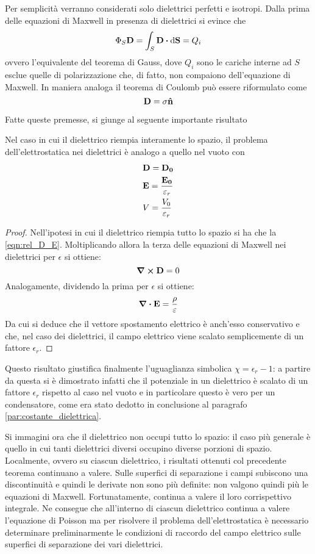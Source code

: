 Per semplicità verranno considerati solo dielettrici perfetti e isotropi.
Dalla prima delle equazioni di Maxwell in presenza di dielettrici si evince che
\[
    \Phi_S{\vb{D}}=\int_S\vb{D}\vdot\dd{\vb{S}}=Q_i
\]
ovvero l'equivalente del teorema di Gauss, dove $Q_i$ sono le cariche interne ad $S$ esclue quelle di polarizzazione che,
di fatto, non compaiono dell'equazione di Maxwell. In maniera analoga il teorema di Coulomb può  essere riformulato come
\[
    \vb{D}=\sigma\vu{n}
\]

Fatte queste premesse, si giunge al seguente importante risultato
\begin{thm}
    Nel caso in cui il dielettrico riempia interamente lo spazio, il problema dell'elettrostatica nei dielettrici è analogo a quello nel vuoto con
    \[
        \begin{split}
            &\vb{D}=\vb{D_0} \\
            &\vb{E}=\frac{\vb{E_0}}{\varepsilon_r} \\
            &V=\frac{V_0}{\varepsilon_r} \\
        \end{split}
    \]
    \label{thm:problema-elettrostatica-dielettrici}
\end{thm}
\begin{proof}
    Nell'ipotesi in cui il dielettrico riempia tutto lo spazio si ha che la \eqref{eqn:rel_D_E}.
    Moltiplicando allora la terza delle equazioni di Maxwell nei dielettrici per $\epsilon$ si ottiene:
    \[
        \curl{\vb{D}}=0
    \]
    Analogamente, dividendo la prima per $\epsilon$ si ottiene:
    \[
        \div{\vb{E}}=\frac{\rho}{\varepsilon}
    \]
    Da cui si deduce che il vettore spostamento elettrico è anch'esso conservativo e che, nel caso dei dielettrici,
    il campo elettrico viene scalato semplicemente di un fattore $\epsilon_r$.
\end{proof}
Questo risultato giustifica finalmente l'uguaglianza simbolica $\chi=\epsilon_r-1$: a partire da questa si è dimostrato infatti
che il potenziale in un dielettrico è scalato di un fattore $\epsilon_r$ rispetto al caso nel vuoto e in particolare
questo è vero per un condensatore, come era stato dedotto in conclusione al paragrafo \ref{par:costante_dielettrica}.

Si immagini ora che il dielettrico non occupi tutto lo spazio: il caso più generale
è quello in cui tanti dielettrici diversi occupino diverse porzioni di spazio.
Localmente, ovvero su ciascun dielettrico, i risultati ottenuti col precedente teorema continuano a valere.
Sulle superfici di separazione i campi subiscono una discontinuità e quindi le derivate non sono più definite:
non valgono quindi più le equazioni di Maxwell. Fortunatamente, continua a valere il loro corrispettivo integrale.
Ne consegue che all'interno di ciascun dielettrico continua a valere l'equazione di Poisson
ma per risolvere il problema dell'elettrostatica è necessario determinare preliminarmente le condizioni di raccordo del campo elettrico
sulle superfici di separazione dei vari dielettrici.

